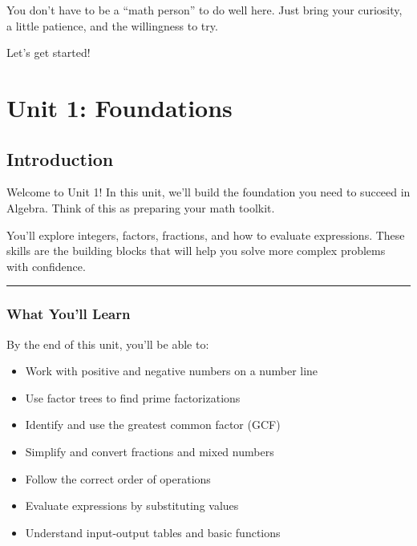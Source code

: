 \documentclass[
  letterpaper,
]{scrrept}
\providecommand{\tightlist}{%
  \setlength{\itemsep}{0pt}\setlength{\parskip}{0pt}}
\begin{document}
You don't have to be a ``math person'' to do well here. Just bring your
curiosity, a little patience, and the willingness to try.

Let's get started!

\part{Unit 1: Foundations}

\chapter*{Introduction}\label{introduction}


Welcome to Unit 1! In this unit, we'll build the foundation you need to
succeed in Algebra. Think of this as preparing your math toolkit.

You'll explore integers, factors, fractions, and how to evaluate
expressions. These skills are the building blocks that will help you
solve more complex problems with confidence.

\begin{center}\rule{0.5\linewidth}{0.5pt}\end{center}

\section*{What You'll Learn}\label{what-youll-learn}


By the end of this unit, you'll be able to:

\begin{itemize}
\tightlist
\item
  Work with positive and negative numbers on a number line
\item
  Use factor trees to find prime factorizations
\item
  Identify and use the greatest common factor (GCF)
\item
  Simplify and convert fractions and mixed numbers
\item
  Follow the correct order of operations
\item
  Evaluate expressions by substituting values
\item
  Understand input-output tables and basic functions
\end{itemize}
\end{document}
